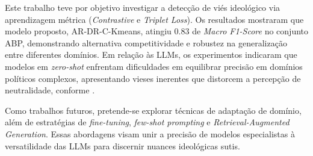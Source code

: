 Este trabalho teve por objetivo investigar a detecção de viés ideológico via aprendizagem métrica (\textit{Contrastive} e \textit{Triplet Loss}). 
Os resultados mostraram que modelo proposto, AR-DR-C-Kmeans, atingiu $0.83$ de \textit{Macro F1-Score} no conjunto ABP, demonstrando alternativa
competitividade e robustez na generalização entre diferentes domínios. Em relação às LLMs, os experimentos indicaram que modelos em \textit{zero-shot} 
enfrentam dificuldades em equilibrar precisão em domínios políticos complexos, apresentando vieses inerentes que distorcem a percepção de neutralidade, conforme \cite{lin-etal-2025-investigating}. 


Como trabalhos futuros, pretende-se explorar técnicas de adaptação de domínio, além de estratégias de \textit{fine-tuning}, \textit{few-shot prompting} e \textit{Retrieval-Augmented Generation}. 
Essas abordagens visam unir a precisão de modelos especialistas à versatilidade das LLMs para discernir nuances ideológicas sutis.